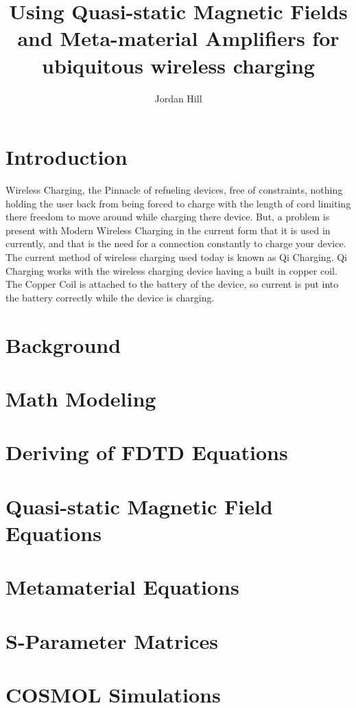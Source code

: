 \documentclass[]{article}
\title{Using Quasi-static Magnetic Fields and Meta-material Amplifiers for ubiquitous wireless charging}
\author{Jordan Hill}
\begin{document}
\maketitle

\begin{abstract}
	
\end{abstract}

\section{Introduction}
Wireless Charging, the Pinnacle of refueling devices, free of constraints, nothing holding the user back from being forced to charge with the length of cord limiting there freedom to move around while charging there device. But, a problem is present with Modern Wireless Charging in the current form that it is used in currently, and that is the need for a connection constantly to charge your device. The current method of wireless charging used today is known as Qi Charging. Qi Charging works with the wireless charging device having a built in copper coil. The Copper Coil is attached to the battery of the device, so current is put into the battery correctly while the device is charging. 
\section{Background}

\section{Math Modeling}

\section{Deriving of FDTD Equations}

\section{Quasi-static Magnetic Field Equations}

\section{Metamaterial Equations} 

\section{S-Parameter Matrices}

\section{COSMOL Simulations}
\end{document}

